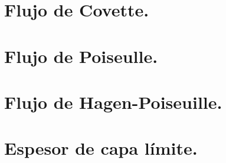 \section{Flujo de Covette.}
\section{Flujo de Poiseulle.}
\section{Flujo de Hagen-Poiseuille.}
\section{Espesor de capa límite.}